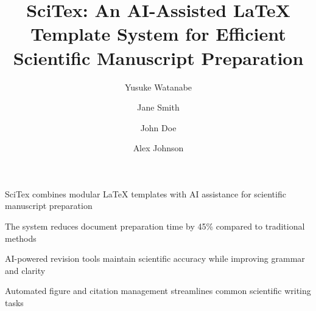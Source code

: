 \documentclass[preprint,review,12pt]{elsarticle}\n
\begin{document}
\begin{frontmatter}

\begin{highlights}

\item SciTex combines modular LaTeX templates with AI assistance for scientific manuscript preparation

\item The system reduces document preparation time by 45\% compared to traditional methods

\item AI-powered revision tools maintain scientific accuracy while improving grammar and clarity

\item Automated figure and citation management streamlines common scientific writing tasks

\end{highlights}


\title{
    SciTex: An AI-Assisted LaTeX Template System for Efficient Scientific Manuscript Preparation
}



\author[1,2]{Yusuke Watanabe}
\author[3]{Jane Smith}
\author[4]{John Doe}
\author[1,5]{Alex Johnson}

\address[1]{Institute for Advanced Cocreation Studies, Osaka University, 2-2 Yamadaoka, Suita, 565-0871, Osaka, Japan}
\address[2]{NeuroEngineering Research Laboratory, Department of Biomedical Engineering, The University of Melbourne, Parkville VIC 3010, Australia}
\address[3]{Department of Computer Science, Stanford University, Stanford, CA 94305, USA}
\address[4]{Digital Humanities Center, University of Oxford, Oxford OX1 2JD, UK}
\address[5]{Center for Scientific Document Analysis, National Institute of Informatics, Tokyo 101-8430, Japan}


\end{frontmatter}
\end{document}
